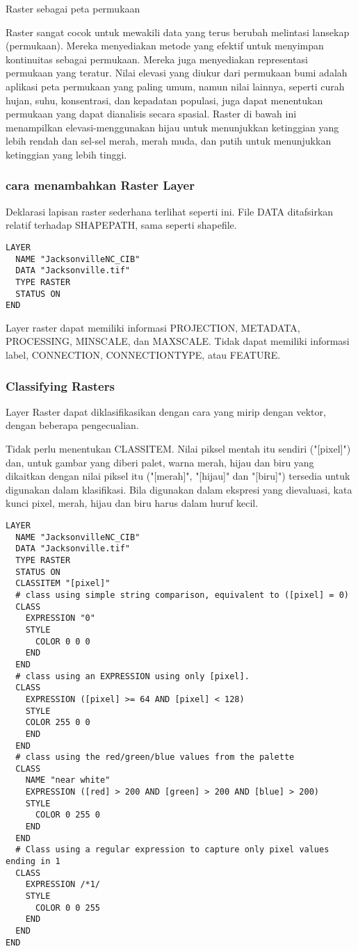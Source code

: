 Raster sebagai peta permukaan

Raster sangat cocok untuk mewakili data yang terus berubah melintasi lansekap (permukaan). Mereka menyediakan metode yang 
efektif untuk menyimpan kontinuitas sebagai permukaan. Mereka juga menyediakan representasi permukaan yang teratur. Nilai 
elevasi yang diukur dari permukaan bumi adalah aplikasi peta permukaan yang paling umum, namun nilai lainnya, seperti curah
hujan, suhu, konsentrasi, dan kepadatan populasi, juga dapat menentukan permukaan yang dapat dianalisis secara spasial. Raster
di bawah ini menampilkan elevasi-menggunakan hijau untuk menunjukkan ketinggian yang lebih rendah dan sel-sel merah, merah muda, 
dan putih untuk menunjukkan ketinggian yang lebih tinggi.


\subsubsection{cara menambahkan Raster Layer}
Deklarasi lapisan raster sederhana terlihat seperti ini. File DATA ditafsirkan relatif terhadap SHAPEPATH, sama seperti shapefile.

\begin{verbatim}
LAYER
  NAME "JacksonvilleNC_CIB"
  DATA "Jacksonville.tif"
  TYPE RASTER
  STATUS ON
END
\end{verbatim}

Layer raster dapat memiliki informasi PROJECTION, METADATA, PROCESSING, MINSCALE, dan MAXSCALE. Tidak dapat memiliki informasi label, CONNECTION, CONNECTIONTYPE, atau FEATURE.

\subsubsection{Classifying Rasters}
Layer Raster dapat diklasifikasikan dengan cara yang mirip dengan vektor, dengan beberapa pengecualian.

Tidak perlu menentukan CLASSITEM. Nilai piksel mentah itu sendiri ("[pixel]") dan, untuk gambar yang diberi palet, warna merah, hijau dan biru yang dikaitkan dengan nilai piksel itu ("[merah]", "[hijau]" dan "[biru]") tersedia untuk digunakan dalam klasifikasi. Bila digunakan dalam ekspresi yang dievaluasi, kata kunci pixel, merah, hijau dan biru harus dalam huruf kecil.

\begin{verbatim}
LAYER
  NAME "JacksonvilleNC_CIB"
  DATA "Jacksonville.tif"
  TYPE RASTER
  STATUS ON
  CLASSITEM "[pixel]"
  # class using simple string comparison, equivalent to ([pixel] = 0)
  CLASS
    EXPRESSION "0"
    STYLE
      COLOR 0 0 0
    END
  END
  # class using an EXPRESSION using only [pixel].
  CLASS
    EXPRESSION ([pixel] >= 64 AND [pixel] < 128)
    STYLE
    COLOR 255 0 0
    END
  END
  # class using the red/green/blue values from the palette
  CLASS
    NAME "near white"
    EXPRESSION ([red] > 200 AND [green] > 200 AND [blue] > 200)
    STYLE
      COLOR 0 255 0
    END
  END
  # Class using a regular expression to capture only pixel values ending in 1
  CLASS
    EXPRESSION /*1/
    STYLE
      COLOR 0 0 255
    END
  END
END
\end{verbatim}


